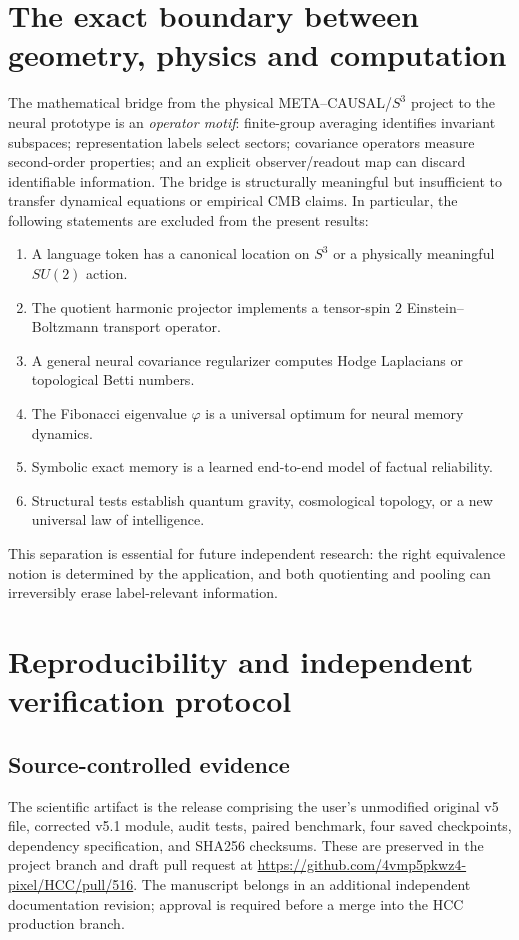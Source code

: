 \documentclass[11pt,a4paper]{article}
\theoremstyle{plain}\newtheorem{theorem}{Theorem}[section]\newtheorem{proposition}[theorem]{Proposition}\newtheorem{lemma}[theorem]{Lemma}
\theoremstyle{definition}\newtheorem{definition}[theorem]{Definition}\newtheorem{remark}[theorem]{Remark}\newtheorem{counterexample}[theorem]{Counterexample}
\begin{document}
\section{The exact boundary between geometry, physics and computation}
The mathematical bridge from the physical META--CAUSAL/$S^3$ project to the neural prototype is an \emph{operator motif}: finite-group averaging identifies invariant subspaces; representation labels select sectors; covariance operators measure second-order properties; and an explicit observer/readout map can discard identifiable information. The bridge is structurally meaningful but insufficient to transfer dynamical equations or empirical CMB claims. In particular, the following statements are excluded from the present results:
\begin{enumerate}[leftmargin=*,itemsep=1pt]
\item A language token has a canonical location on $S^3$ or a physically meaningful $SU(2)$ action.
\item The quotient harmonic projector implements a tensor-spin $2$ Einstein--Boltzmann transport operator.
\item A general neural covariance regularizer computes Hodge Laplacians or topological Betti numbers.
\item The Fibonacci eigenvalue $\varphi$ is a universal optimum for neural memory dynamics.
\item Symbolic exact memory is a learned end-to-end model of factual reliability.
\item Structural tests establish quantum gravity, cosmological topology, or a new universal law of intelligence.
\end{enumerate}
This separation is essential for future independent research: the right equivalence notion is determined by the application, and both quotienting and pooling can irreversibly erase label-relevant information.

\section{Reproducibility and independent verification protocol}
\subsection{Source-controlled evidence}
The scientific artifact is the release comprising the user's unmodified original v5 file, corrected v5.1 module, audit tests, paired benchmark, four saved checkpoints, dependency specification, and SHA256 checksums. These are preserved in the project branch and draft pull request at \url{https://github.com/4vmp5pkwz4-pixel/HCC/pull/516}. The manuscript belongs in an additional independent documentation revision; approval is required before a merge into the HCC production branch.
\end{document}
